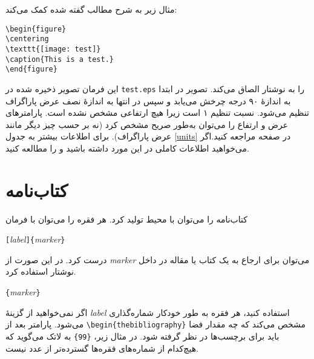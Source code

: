 مثال زیر به شرح مطالب گفته شده کمک می‌کند:
\begin{code}
\begin{verbatim}
\begin{figure}
\centering
\texttt{[image: test]}
\caption{This is a test.}
\end{figure}
\end{verbatim}
\end{code}
این فرمان تصویر ذخیره شده در \texttt{test.eps} را به نوشتار‌ الصاق می‌کند. تصویر در ابتدا به اندازهٔ ۹۰ درجه چرخش می‌یابد و سپس در 
انتها به اندازهٔ نصف عرض پاراگراف تنظیم می‌شود.   نسبت تنظیم ۱ است زیرا هیچ ارتفاعی مشخص نشده است. پارامترهای عرض و ارتفاع را می‌توان به‌طور صریح مشخص کرد 
(نه بر حسب چیز دیگر مانند عرض پاراگراف).
برای اطلاعات بیشتر به جدول  
\ref{units}
در صفحه 
\pageref{units} مراجعه کنید.اگر می‌خواهید اطلاعات کاملی در این مورد داشته باشید 
\cite{graphics} و \cite{eps}
 را مطالعه کنید.
\thispagestyle{fancy}
\section{کتاب‌نامه}

کتاب‌نامه 
را می‌توان با محیط  تولید کرد. هر فقره را می‌توان با فرمان 
\begin{lscommand}
\verb|[|\emph{label}\verb|]{|\emph{marker}\verb|}|
\end{lscommand}
درست کرد. در این صورت از 
\emph{marker} می‌توان برای ارجاع به یک کتاب یا مقاله در داخل نوشتار‌ استفاده کرد.
\begin{lscommand}
\verb|{|\emph{marker}\verb|}|
\end{lscommand}
اگر نمی‌خواهید از گزینهٔ  
\emph{label} استفاده کنید، هر فقره به طور خودکار شماره‌گذاری می‌شود. پارامتر بعد از  \verb|\begin{thebibliography}| مشخص می‌کند که چه مقدار فضا باید برای برچسب‌ها در نظر گرفته شود. در مثال زیر، 
\verb|{99}| به لاتک می‌گوید که هیچ‌کدام از شماره‌های فقره‌ها گسترده‌تر از عدد  نیست.

